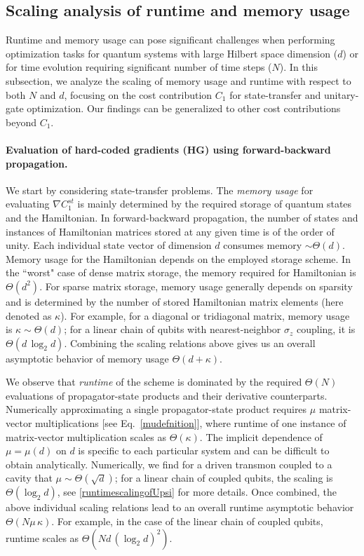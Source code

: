 \documentclass[12pt]{article}
\begin{document}
\subsection{Scaling analysis of runtime and memory usage}
\label{scaling analysis}
Runtime and memory usage can pose significant challenges when performing optimization tasks for quantum systems with large Hilbert space dimension ($d$) or for time evolution requiring significant number of time steps ($N$). In this subsection, we analyze the scaling of memory usage and runtime with respect to both $N$ and $d$, focusing on the cost contribution $C_1$ for state-transfer and unitary-gate optimization. Our findings can be generalized to other cost contributions beyond $C_1$.

\paragraph{Evaluation of hard-coded gradients (HG) using forward-backward propagation.}
\label{AGscaling}
We start by considering state-transfer problems. The \textit{memory usage} for evaluating $\nabla C_1^{st}$ is mainly determined by the required storage of quantum states and the Hamiltonian. In forward-backward propagation, the number of states and instances of Hamiltonian matrices stored at any given time is of the order of unity. Each individual state vector of dimension $d$ consumes memory $\sim\Theta(d)$. Memory usage for the Hamiltonian depends on the employed storage scheme. In the ``worst" case of dense matrix storage, the memory required for Hamiltonian is $\Theta(d^2)$. For sparse matrix storage, memory usage generally depends on sparsity and is determined by the number of stored Hamiltonian matrix elements (here denoted as $\kappa$). For example, for a diagonal or tridiagonal matrix, memory usage is $\kappa\sim\Theta(d)$; for a linear chain of qubits with nearest-neighbor $\sigma_z$ coupling, it is $\Theta(d\, \log_2 d)$. Combining the scaling relations above gives us an overall asymptotic behavior of memory usage $\Theta(d+\kappa)$.

We observe that \textit{runtime} of the scheme is dominated by the required $\Theta(N)$ evaluations of propagator-state products and their derivative counterparts. Numerically approximating a single propagator-state product requires $\mu$ matrix-vector multiplications [see Eq.\ \eqref{mudefnition}], where runtime of one instance of matrix-vector multiplication scales as $\Theta(\kappa)$.  The implicit dependence of $\mu=\mu(d)$ on $d$ is specific to each particular system and can be difficult to obtain analytically. Numerically, we find for a driven transmon coupled to a cavity that $\mu\sim\Theta(\sqrt{d})$; for a linear chain of coupled qubits, the scaling is $\Theta(\log_2 d)$, see  \ref{runtimescalingofUpsi} for more details. 
Once combined, the above individual scaling relations lead to an overall runtime asymptotic behavior 
$\Theta(N\mu\, \kappa)$. For example, in the case of the linear chain of coupled qubits, runtime scales as $\Theta(Nd\, (\log_2 d )^2)$.
\end{document}
